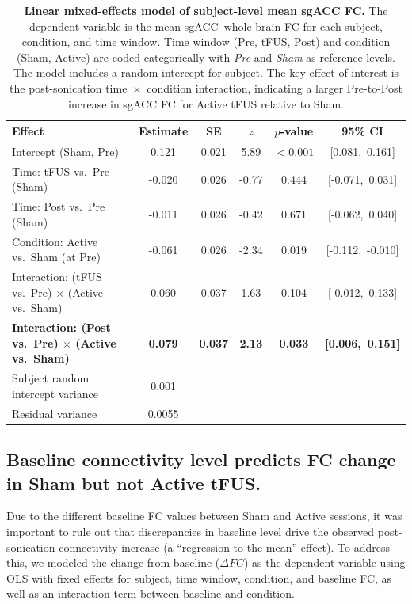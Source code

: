 \begin{table}[t]
    \centering
    \caption{\textbf{Linear mixed-effects model of subject-level mean sgACC FC.}
    The dependent variable is the mean sgACC--whole-brain FC for each subject, condition, 
    and time window. Time window (Pre, tFUS, Post) and condition (Sham, Active) are coded 
    categorically with \textit{Pre} and \textit{Sham} as reference levels. The model includes 
    a random intercept for subject. The key effect of interest is the post-sonication 
    time~$\times$~condition interaction, indicating a larger Pre-to-Post increase in sgACC FC 
    for Active tFUS relative to Sham.}
    \label{tab:mixedlm_sgacc}
    \begin{tabular}{lccccc}
    \toprule
    Effect & Estimate & SE & $z$ & $p$-value & 95\% CI \\
    \midrule
    Intercept (Sham, Pre)                                       & 0.121 & 0.021 &  5.89 & $<0.001$ & [0.081,\ 0.161] \\
    Time: tFUS vs.\ Pre (Sham)                                  &-0.020 & 0.026 & -0.77 & 0.444   & [-0.071,\ 0.031] \\
    Time: Post vs.\ Pre (Sham)                                 &-0.011 & 0.026 & -0.42 & 0.671   & [-0.062,\ 0.040] \\
    Condition: Active vs.\ Sham (at Pre)                       &-0.061 & 0.026 & -2.34 & 0.019   & [-0.112,\ -0.010] \\
    Interaction: (tFUS vs.\ Pre) $\times$ (Active vs.\ Sham)    & 0.060 & 0.037 &  1.63 & 0.104   & [-0.012,\ 0.133] \\
    \bf{Interaction: (Post vs.\ Pre) $\times$ (Active vs.\ Sham)}  & \bf{0.079} & \bf{0.037} &  \bf{2.13} & \bf{0.033}   & \bf{ [0.006,\ 0.151] } \\
    \midrule
    Subject random intercept variance                          & 0.001 &       &       &         &              \\
    Residual variance                                          & 0.0055&       &       &         &              \\
    \bottomrule
    \end{tabular}
    \end{table}



        
        \subsection*{Baseline connectivity level predicts FC change in Sham but not Active tFUS.}
        \noindent
        Due to the different baseline FC values between Sham and Active sessions, it was important to rule out that discrepancies in baseline level drive the observed post-sonication connectivity increase (a ``regression-to-the-mean'' effect). To address this, we modeled the change from baseline ($\Delta FC$) as the dependent variable using OLS with fixed effects for subject, time window, condition, and baseline FC, as well as an interaction term between baseline and condition. 

